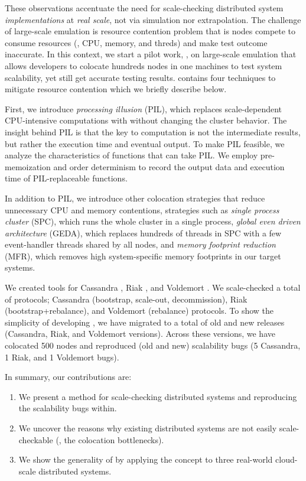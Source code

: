 These observations accentuate the need for scale-checking distributed system
{\em implementations} at {\em real scale}, not via simulation nor extrapolation.
The challenge of large-scale emulation is resource contention problem that is
nodes compete to consume resources (\eg, CPU, memory, and threds) and make test
outcome inaccurate.
%
In this context, we start a pilot work, \sck, on large-scale emulation that
allows developers to colocate hundreds nodes in one machines to test system
scalability, yet still get accurate testing results. \sck contains four
techniques to mitigate resource contention which we briefly describe below.

First, we introduce {\em processing illusion} (PIL), which replaces
scale-dependent CPU-intensive computations with \sleep without changing the
cluster behavior.  The insight behind PIL is that the key to computation is not
the intermediate results, but rather the execution time and eventual output.  To
make PIL feasible, we analyze the characteristics of functions that can take
PIL.  We employ pre-memoization and order determinism to record the output data
and execution time of PIL-replaceable functions.

In addition to PIL, we introduce other colocation strategies
that reduce unnecessary CPU and memory contentions, strategies such as
%
{\em single process cluster} (SPC), which runs the whole cluster
in a single process,
%
{\em global even driven architecture} (GEDA), which replaces
hundreds of threads in SPC with a few event-handler threads
shared by all nodes,
%
and {\em memory footprint reduction} (MFR), which removes high
system-specific memory footprints in our target systems.

We created \sck tools for Cassandra \cite{Lakshman+09-Cassandra}, Riak
\cite{RiakWeb}, and Voldemort \cite{VoldemortWeb}.
%
We scale-checked a total of \numProt protocols; \numProtCass Cassandra
(bootstrap, scale-out, decommission), \numProtRiak Riak (bootstrap+rebalance),
and \numProtVold Voldemort (rebalance) protocols.
%
To show the simplicity of developing \sck, we have migrated \sck to a total of
\numVers old and new releases (\numVersCass Cassandra, \numVersRiak Riak, and
\numVersVold Voldemort versions).
%
Across these versions, we have colocated 500 nodes and reproduced \numEval (old
and new) scalability bugs (5 Cassandra, 1 Riak, and 1 Voldemort bugs).

In summary, our contributions are:
%
\begin{enumerate} \item We present a method for scale-checking distributed
systems and reproducing the scalability bugs within.
%
\item We uncover the reasons why existing distributed systems are not easily
scale-checkable (\ie, the colocation bottlenecks).
%
\item We show the generality of \sck by applying the concept to three real-world
cloud-scale distributed systems.
%
\end{enumerate}

